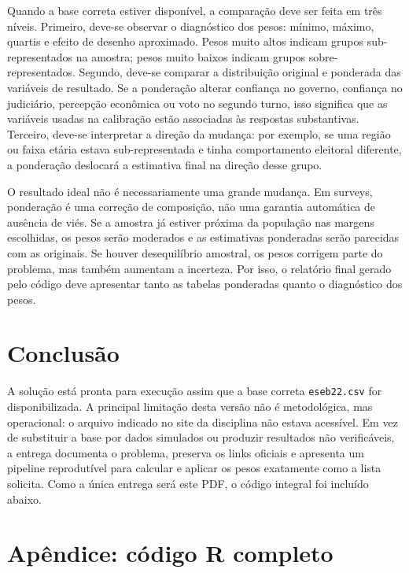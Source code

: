 \documentclass[11pt,a4paper]{article}
\begin{document}
Quando a base correta estiver disponível, a comparação deve ser feita em três níveis. Primeiro, deve-se observar o diagnóstico dos pesos: mínimo, máximo, quartis e efeito de desenho aproximado. Pesos muito altos indicam grupos sub-representados na amostra; pesos muito baixos indicam grupos sobre-representados. Segundo, deve-se comparar a distribuição original e ponderada das variáveis de resultado. Se a ponderação alterar confiança no governo, confiança no judiciário, percepção econômica ou voto no segundo turno, isso significa que as variáveis usadas na calibração estão associadas às respostas substantivas. Terceiro, deve-se interpretar a direção da mudança: por exemplo, se uma região ou faixa etária estava sub-representada e tinha comportamento eleitoral diferente, a ponderação deslocará a estimativa final na direção desse grupo.

O resultado ideal não é necessariamente uma grande mudança. Em surveys, ponderação é uma correção de composição, não uma garantia automática de ausência de viés. Se a amostra já estiver próxima da população nas margens escolhidas, os pesos serão moderados e as estimativas ponderadas serão parecidas com as originais. Se houver desequilíbrio amostral, os pesos corrigem parte do problema, mas também aumentam a incerteza. Por isso, o relatório final gerado pelo código deve apresentar tanto as tabelas ponderadas quanto o diagnóstico dos pesos.

\section*{Conclusão}

A solução está pronta para execução assim que a base correta \texttt{eseb22.csv} for disponibilizada. A principal limitação desta versão não é metodológica, mas operacional: o arquivo indicado no site da disciplina não estava acessível. Em vez de substituir a base por dados simulados ou produzir resultados não verificáveis, a entrega documenta o problema, preserva os links oficiais e apresenta um pipeline reprodutível para calcular e aplicar os pesos exatamente como a lista solicita. Como a única entrega será este PDF, o código integral foi incluído abaixo.

\newpage
\section*{Apêndice: código R completo}


\end{document}
